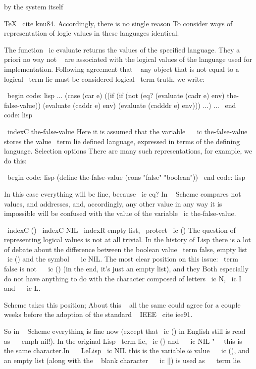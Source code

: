 by the system itself {{ TeX } \ cite {knu84}. Accordingly, there is no single reason
To consider ways of representation of logic values ​​in these languages ​​identical.

The function \ ic {evaluate} returns the values ​​of the specified language. They a priori no way
not ~ are associated with the logical values ​​of the language used for implementation. Following
agreement that ~ any object that is not equal to a logical \ term {lie} must
be considered logical \ term {truth}, we write:

\ begin {code: lisp}
... (case (car e)
      ((if (if (not (eq? (evaluate (cadr e) env) the-false-value))
                (evaluate (caddr e) env)
                (evaluate (cadddr e) env))) ...) ...
\ end {code: lisp}

\ indexC {the-false-value}
Here it is assumed that the variable ~ \ ic {the-false-value} stores the value \ term {lie}
defined language, expressed in terms of the defining language. Selection options
There are many such representations, for example, we do this:

\ begin {code: lisp}
(define the-false-value (cons "false" "boolean"))
\ end {code: lisp}

In this case everything will be fine, because \ ic {eq?} In ~ Scheme compares
not ~ values, and addresses, and, accordingly, any other value in any way it is impossible
will be confused with the value of the variable \ ic {the-false-value}.

\ indexC {()} \ indexC {NIL} \ indexR {empty list, \ protect \ ic {()}}
The question of representing logical values ​​is not at all trivial. In the history of Lisp
there is a lot of debate about the difference between the boolean value \ term {false}, empty
list ~ \ ic {()} and the symbol ~ \ ic {NIL}. The most clear position on this issue:
\ term {false} is not ~ \ ic {()} (in the end, it's just an empty list), and they
Both especially do not have anything to do with the character composed of letters
\ ic {N}, \ ic {I} and ~ \ ic {L}.

Scheme takes this position; About this ~ all the same could agree for a couple
weeks before the adoption of the standard ~ IEEE \ cite {iee91}.

So in ~ Scheme everything is fine now (except that \ ic {()} in English still
is read as ~ \ emph {nil}!). In the original Lisp \ term {lie}, \ ic {()} and ~ \ ic {NIL}
"--- this is the same character.In ~ { \ LeLisp } \ ic {NIL} this is the variable ω
value ~ \ ic {()}, and an empty list (along with the ~ blank character ~ \ ic {||})
is used as ~ \ term {lie}.


}
